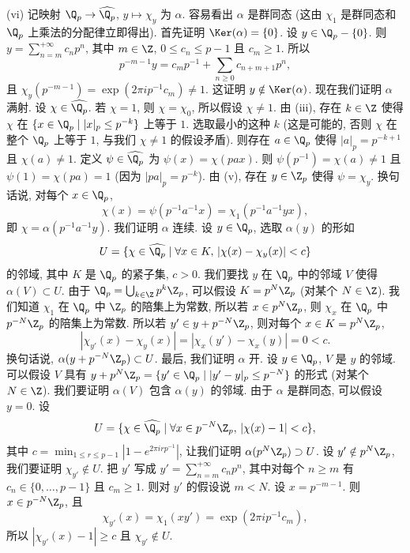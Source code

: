 \begin{solution}
(vi) 记映射 $\Q_p \to \widehat{\Q_p}$, $y \longmapsto \chi_y$ 为 $\alpha$. 容易看出 $\alpha$ 是群同态 (这由 $\chi_1$ 是群同态和 $\Q_p$ 上乘法的分配律立即得出).
首先证明 $\Ker(\alpha) = \{0\}$. 设 $y \in \Q_p - \{0\}$. 则 $y = \sum_{n=m}^{+\infty}c_np^n$, 其中 $m \in \Z$, $0 \leq c_n \leq p - 1$ 且 $c_m \geq 1$. 所以
\[
p^{-m-1}y = c_mp^{-1} + \sum_{n \geq 0}c_{n+m+1}p^n,
\]
且 $\chi_y(p^{-m-1}) = \exp(2\pi ip^{-1}c_m) \neq 1$. 这证明 $y \notin \Ker(\alpha)$.
现在我们证明 $\alpha$ 满射. 设 $\chi \in \widehat{\Q_p}$. 若 $\chi = 1$, 则 $\chi = \chi_0$, 所以假设 $\chi \neq 1$. 由 (iii), 存在 $k \in \Z$ 使得 $\chi$ 在 $\{x \in \Q_p \mid |x|_p \leq p^{-k}\}$ 上等于 $1$. 选取最小的这种 $k$ (这是可能的, 否则 $\chi$ 在整个 $\Q_p$ 上等于 $1$, 与我们 $\chi \neq 1$ 的假设矛盾). 则存在 $a \in \Q_p$ 使得 $|a|_p = p^{-k+1}$ 且 $\chi(a) \neq 1$. 定义 $\psi \in \widehat{\Q_p}$ 为 $\psi(x) = \chi(pax)$. 则 $\psi(p^{-1}) = \chi(a) \neq 1$ 且 $\psi(1) = \chi(pa) = 1$ (因为 $|pa|_p = p^{-k}$). 由 (v), 存在 $y \in \Z_p$ 使得 $\psi = \chi_y$. 换句话说, 对每个 $x \in \Q_p$,
\[
\chi(x) = \psi(p^{-1}a^{-1}x) = \chi_1(p^{-1}a^{-1}yx),
\]
即 $\chi = \alpha(p^{-1}a^{-1}y)$.
我们证明 $\alpha$ 连续. 设 $y \in \Q_p$, 选取 $\alpha(y)$ 的形如
\[
U = \{\chi \in \widehat{\Q_p} \mid \forall x \in K,\, |\chi(x) - \chi_y(x)| < c\}
\]
的邻域, 其中 $K$ 是 $\Q_p$ 的紧子集, $c > 0$. 我们要找 $y$ 在 $\Q_p$ 中的邻域 $V$ 使得 $\alpha(V) \subset U$.
由于 $\Q_p = \bigcup_{k \in \Z}p^k\Z_p$, 可以假设 $K = p^N\Z_p$ (对某个 $N \in \Z$). 我们知道 $\chi_1$ 在 $\Q_p$ 中 $\Z_p$ 的陪集上为常数, 所以若 $x \in p^N\Z_p$, 则 $\chi_x$ 在 $\Q_p$ 中 $p^{-N}\Z_p$ 的陪集上为常数. 所以若 $y' \in y + p^{-N}\Z_p$, 则对每个 $x \in K = p^N\Z_p$,
\[
|\chi_{y'}(x) - \chi_y(x)| = |\chi_x(y') - \chi_x(y)| = 0 < c.
\]
换句话说, $\alpha(y + p^{-N}\Z_p) \subset U$.
最后, 我们证明 $\alpha$ 开. 设 $y \in \Q_p$, $V$ 是 $y$ 的邻域. 可以假设 $V$ 具有 $y + p^N\Z_p = \{y' \in \Q_p \mid |y' - y|_p \leq p^{-N}\}$ 的形式 (对某个 $N \in \Z$). 我们要证明 $\alpha(V)$ 包含 $\alpha(y)$ 的邻域. 由于 $\alpha$ 是群同态, 可以假设 $y = 0$. 设
\[
U = \{\chi \in \widehat{\Q_p} \mid \forall x \in p^{-N}\Z_p,\, |\chi(x) - 1| < c\},
\]
其中 $c = \min_{1 \leq r \leq p-1}|1 - e^{2\pi irp^{-1}}|$, 让我们证明 $\alpha(p^N\Z_p) \supset U$. 设 $y' \notin p^N\Z_p$, 我们要证明 $\chi_{y'} \notin U$. 把 $y'$ 写成 $y' = \sum_{n=m}^{+\infty}c_np^n$, 其中对每个 $n \geq m$ 有 $c_n \in \{0, \ldots, p-1\}$ 且 $c_m \geq 1$. 则对 $y'$ 的假设说 $m < N$. 设 $x = p^{-m-1}$. 则 $x \in p^{-N}\Z_p$, 且
\[
\chi_{y'}(x) = \chi_1(xy') = \exp(2\pi ip^{-1}c_m),
\]
所以 $|\chi_{y'}(x) - 1| \geq c$ 且 $\chi_{y'} \notin U$.


\end{solution}
